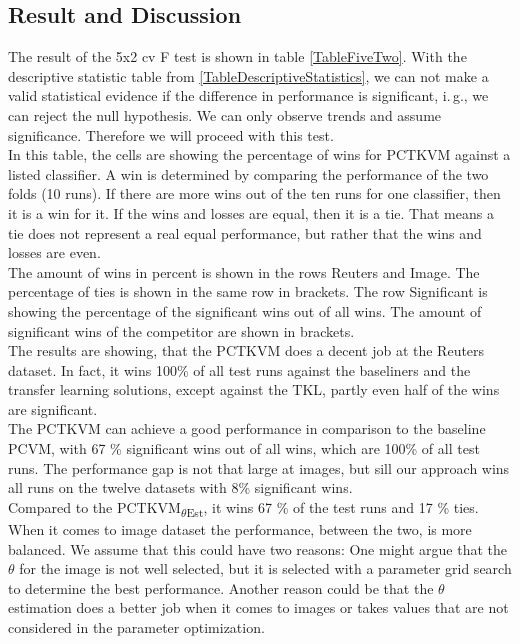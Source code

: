 \subsection{Result and Discussion}\label{EmSubSecResOneDa}
The result of the 5x2 cv F test is shown in table \ref{TableFiveTwo}.
With the descriptive statistic table from \ref{TableDescriptiveStatistics}, we can not make a valid statistical evidence if the difference in performance is significant, i.\,g., we can reject the null hypothesis.\cite[p. 9]{JanezDemsar.2006}
We can only observe trends and assume significance.
Therefore we will proceed with this test.\\
In this table, the cells are showing the percentage of wins for \acs{PCTKVM} against a listed classifier.
A win is determined by comparing the performance of the two folds (10 runs).
If there are more wins out of the ten runs for one classifier, then it is a win for it.
If the wins and losses are equal, then it is a tie.
That means a tie does not represent a real equal performance, but rather that the wins and losses are even.\\ 
The amount of wins in percent is shown in the rows Reuters and Image.
The percentage of ties is shown in the same row in brackets. 
The row Significant is showing the percentage of the significant wins out of all wins.
The amount of significant wins of the competitor are shown in brackets.\\
The results are showing, that the \acs{PCTKVM} does a decent job at the Reuters dataset.
In fact, it wins 100\% of all test runs against the baseliners and the transfer learning solutions, except against the \acs{TKL}, partly even half of the wins are significant.\\
The \acs{PCTKVM} can achieve a good performance in comparison to the baseline \acs{PCVM}, with 67 \% significant wins out of all wins, which are 100\% of all test runs. 
The performance gap is not that large at images, but sill our approach wins all runs on the twelve datasets with 8\% significant wins.\\
Compared to the \acs{PCTKVM}\textsubscript{$\theta$Est}, it wins 67 \% of the test runs and  17 \% ties.
When it comes to image dataset the performance, between the two, is more balanced.
We assume that this could have two reasons:
One might argue that the $\theta$ for the image is not well selected, but it is selected with a parameter grid search to determine the best performance. Another reason could be that the $\theta$ estimation does a better job when it comes to images or takes values that are not considered in the parameter optimization.\\
